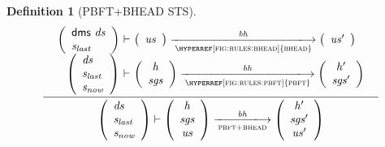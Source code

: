 \documentclass[11pt,a4paper]{article}
\newcommand{\var}[1]{\mathit{#1}}
\newcommand{\fun}[1]{\mathsf{#1}}
\newcommand{\trans}[2]{\xlongrightarrow[\textsc{#1}]{#2}}
\newtheorem{definition}{Definition}
\begin{document}
\begin{definition}[PBFT+BHEAD STS]\label{def:rule:pbft+bhead}
  $$
  \inference
  {
    {\begin{array}{r@{~\vdash~}l}
        {\left(
        \begin{array}{l}
          \fun{dms}~\var{ds}\\
          \var{s_{last}}
        \end{array}
        \right)}
        &
        \left(
          {\begin{array}{c}
             \var{us}
           \end{array}
        }\right)
        \trans{\hyperref[fig:rules:bhead]{bhead}}{\var{bh}}
        \left(
        {\begin{array}{c}
           \var{us'}
         \end{array}}
        \right)\\
        \left(
        {\begin{array}{l}
           \var{ds} \\
           \var{s_{last}} \\
           \var{s_{now}} \\
         \end{array}}
        \right)
        &
        \left(
          {\begin{array}{c}
             \var{h} \\
             \var{sgs}
           \end{array}}
        \right)
        \trans{\hyperref[fig:rules:pbft]{pbft}}{\var{bh}}
        \left(
        {\begin{array}{c}
           \var{h'} \\
           \var{sgs}'
         \end{array}}
        \right)\\
      \end{array}}
  }
  {
    {\left(
        {\begin{array}{l}
           \var{ds} \\
           \var{s_{last}} \\
           \var{s_{now}} \\
         \end{array}}
     \right)
     \vdash
     \left(
          {\begin{array}{c}
             \var{h} \\
             \var{sgs}\\
             \var{us}
           \end{array}}
       \right)
       \trans{pbft+bhead}{\var{bh}}
        \left(
        {\begin{array}{c}
           \var{h'} \\
           \var{sgs}'\\
           \var{us'}
         \end{array}}
     \right)
     }
   }
  $$
\end{definition}
\end{document}
